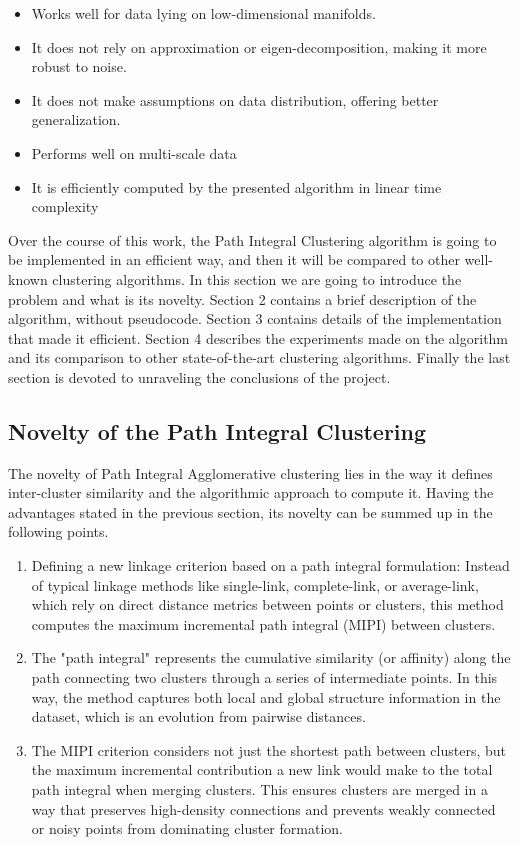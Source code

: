 \documentclass[
	10pt,
	parskip=half-,	
	paper=a4,
	english
	]{scrartcl}
\begin{document}
\begin{itemize}
    \item Works well for data lying on low-dimensional manifolds.
    \item It does not rely on approximation or eigen-decomposition, making it more robust to noise.
    \item It does not make assumptions on data distribution, offering better generalization.
    \item Performs well on multi-scale data
    \item It is efficiently computed by the presented algorithm in linear time complexity
\end{itemize}

Over the course of this work, the Path Integral Clustering algorithm is going to be implemented in an efficient way, and then it will be compared to other well-known clustering algorithms. In this section we are going to introduce the problem and what is its novelty. Section 2 contains a brief description of the algorithm, without pseudocode. Section 3 contains details of the implementation that made it efficient. Section 4 describes the experiments made on the algorithm and its comparison to other state-of-the-art clustering algorithms. Finally the last section is devoted to unraveling the conclusions of the project.

\subsection{Novelty of the Path Integral Clustering}

The novelty of Path Integral Agglomerative clustering lies in the way it defines inter-cluster similarity and the algorithmic approach to compute it. Having the advantages stated in the previous section, its novelty can be summed up in the following points.

\begin{enumerate}
    \item Defining a new linkage criterion based on a path integral formulation: Instead of typical linkage methods like single-link, complete-link, or average-link, which rely on direct distance metrics between points or clusters, this method computes the maximum incremental path integral (MIPI) between clusters.
    
    \item The "path integral" represents the cumulative similarity (or affinity) along the path connecting two clusters through a series of intermediate points. In this way, the method captures both local and global structure information in the dataset, which is an evolution from pairwise distances.
    
    \item The MIPI criterion considers not just the shortest path between clusters, but the maximum incremental contribution a new link would make to the total path integral when merging clusters. This ensures clusters are merged in a way that preserves high-density connections and prevents weakly connected or noisy points from dominating cluster formation.
\end{enumerate}
\end{document}
